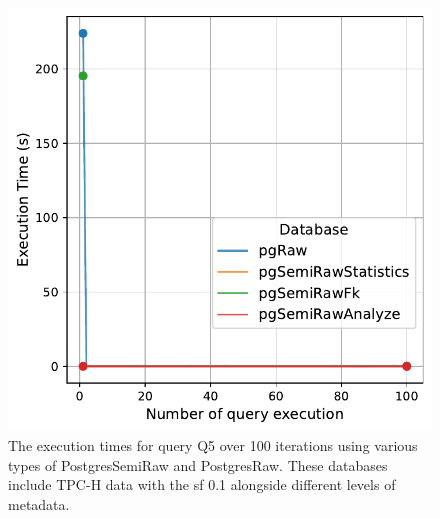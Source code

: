 \begin{figure}[hbt!]
\centering
\includegraphics[width=1.0\linewidth]{charts-eval-exp-time-stat/execution_time_db_type_Q5.pdf}
\caption[Q5:result]{The execution times for query Q5 over 100 iterations using various types of PostgresSemiRaw and PostgresRaw. These databases include TPC-H data with the \acrshort{sf} 0.1 alongside different levels of metadata.}
\label{fig:execution_time_db_type_Q5}
\end{figure}
